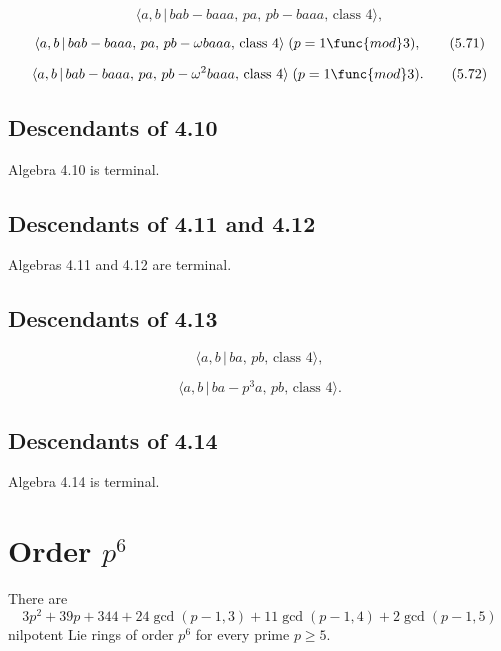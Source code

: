 \documentclass[10pt]{article}
\begin{document}
\begin{equation}
\langle a,b\,|\,bab-baaa,\,pa,\,pb-baaa,\,\text{class }4\rangle ,  \tag{5.70}
\end{equation}

\begin{equation}
\langle a,b\,|\,bab-baaa,\,pa,\,pb-\omega baaa,\,\text{class }4\rangle \;(p=1%
\func{mod}3),  \tag{5.71}
\end{equation}

\begin{equation}
\langle a,b\,|\,bab-baaa,\,pa,\,pb-\omega ^{2}baaa,\,\text{class }4\rangle
\;(p=1\func{mod}3).  \tag{5.72}
\end{equation}

\subsection{Descendants of 4.10}

Algebra 4.10 is terminal.

\subsection{Descendants of 4.11 and 4.12}

Algebras 4.11 and 4.12 are terminal.

\subsection{Descendants of 4.13}

\begin{equation}
\langle a,b\,|\,ba,\,pb,\,\text{class }4\rangle ,  \tag{5.73}
\end{equation}

\begin{equation}
\langle a,b\,|\,ba-p^{3}a,\,pb,\,\text{class }4\rangle .  \tag{5.74}
\end{equation}

\subsection{Descendants of 4.14}

Algebra 4.14 is terminal.

\section{Order $p^6$}

There are%
\[
3p^{2}+39p+344+24\gcd (p-1,3)+11\gcd (p-1,4)+2\gcd (p-1,5) 
\]%
nilpotent Lie rings of order $p^{6}$ for every prime $p\geq 5$.
\end{document}
